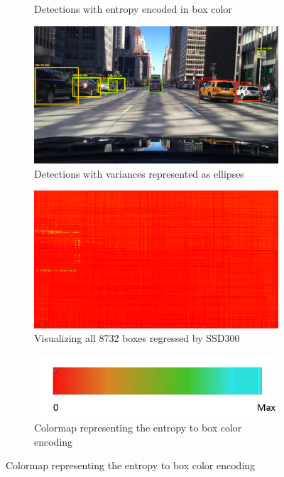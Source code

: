 \begin{figure}[H]
\begin{subfigure}[t]{0.495\textwidth}
    		\caption{Detections with entropy encoded in box color}
    	\end{subfigure}
    	\begin{subfigure}[t]{0.495\textwidth}
    		\centering
    		\includegraphics[width=\textwidth]{images/det_images/bdd_bnn_variances_1.png}
    		\caption{Detections with variances represented as ellipses}
    	\end{subfigure}
    	\begin{subfigure}[t]{0.495\textwidth}
    		\centering
    		\includegraphics[width=\textwidth]{images/det_images/all_bnn_bdd_1.png}
    		\caption{Visualizing all 8732 boxes regressed by SSD300}
    		\label{id_8732_boxes}
    	\end{subfigure}
    	
    	\begin{center}
    	    \begin{subfigure}[t]{0.495\textwidth}
    		\centering
    		\includegraphics[width=\textwidth]{images/Slide4.jpg}
    		\caption{Colormap representing the entropy to box color encoding}
    	\end{subfigure}
    	\label{bnn_inference_id}
    	\end{center}
    	

\end{figure}
